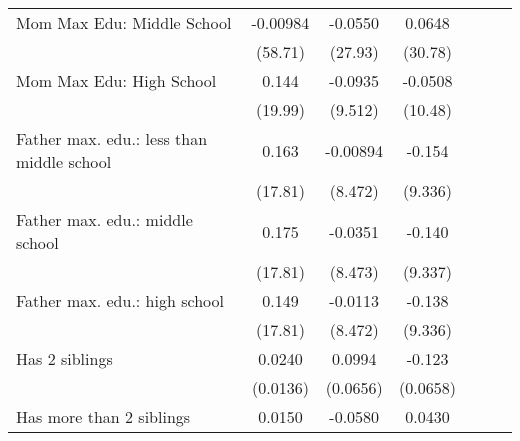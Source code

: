 {\begin{tabular}{l*{6}{c}}
\addlinespace
Mom Max Edu: Middle School&    -0.00984         &     -0.0550         &      0.0648         &                     &                     &                     \\
                    &     (58.71)         &     (27.93)         &     (30.78)         &                     &                     &                     \\
\addlinespace
Mom Max Edu: High School&       0.144         &     -0.0935         &     -0.0508         &                     &                     &                     \\
                    &     (19.99)         &     (9.512)         &     (10.48)         &                     &                     &                     \\
\addlinespace
Father max. edu.: less than middle school&       0.163         &    -0.00894         &      -0.154         &                     &                     &                     \\
                    &     (17.81)         &     (8.472)         &     (9.336)         &                     &                     &                     \\
\addlinespace
Father max. edu.: middle school&       0.175         &     -0.0351         &      -0.140         &                     &                     &                     \\
                    &     (17.81)         &     (8.473)         &     (9.337)         &                     &                     &                     \\
\addlinespace
Father max. edu.: high school&       0.149         &     -0.0113         &      -0.138         &                     &                     &                     \\
                    &     (17.81)         &     (8.472)         &     (9.336)         &                     &                     &                     \\
\addlinespace
Has 2 siblings      &      0.0240         &      0.0994         &      -0.123         &                     &                     &                     \\
                    &    (0.0136)         &    (0.0656)         &    (0.0658)         &                     &                     &                     \\
\addlinespace
Has more than 2 siblings&      0.0150         &     -0.0580         &      0.0430         &                     &                     &                     \\

\end{tabular}}
